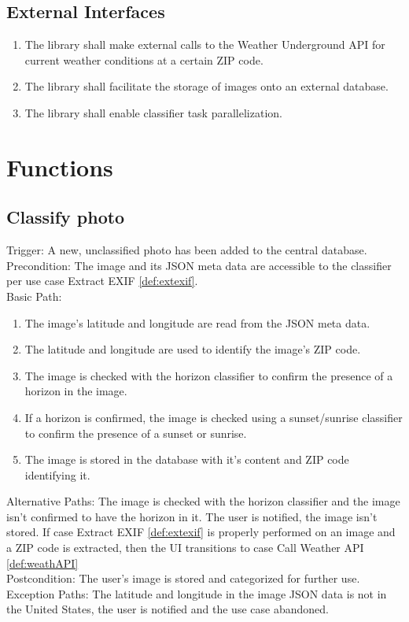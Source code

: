 \documentclass[journal,10pt,draftclsnofoot,onecolumn]{IEEEtran}
\begin{document}
\begin{singlespace}
	\subsection{External Interfaces}
		\begin{enumerate}
			\item The library shall make external calls to the Weather Underground API \cite{api_weather_underground} for current weather conditions at a certain ZIP code.
			\item The library shall facilitate the storage of images onto an external database.
			\item The library shall enable classifier task parallelization.
		\end{enumerate}

\clearpage

\section{Functions}
	\subsection{Classify photo} \label{def:classPh}
		Trigger: A new, unclassified photo has been added to the central database.\\
		Precondition: The image and its JSON meta data are accessible to the classifier per use case Extract EXIF \ref{def:extexif}.\\
		Basic Path:
		\begin{enumerate}
			\item The image's latitude and longitude are read from the JSON meta data.
			\item The latitude and longitude are used to identify the image's ZIP code.
			\item The image is checked with the horizon classifier to confirm the presence of a horizon in the image.
			\item If a horizon is confirmed, the image is checked using a sunset/sunrise classifier to confirm the presence of a sunset or sunrise.
			\item The image is stored in the database with it's content and ZIP code identifying it.
		\end{enumerate}
		Alternative Paths: The image is checked with the horizon classifier and the image isn't confirmed to have the horizon in it. The user is notified, the image isn't stored. If case Extract EXIF \ref{def:extexif} is properly performed on an image and a ZIP code is extracted, then the UI transitions to case Call Weather API \ref{def:weathAPI}\\
		Postcondition: The user's image is stored and categorized for further use.\\
		Exception Paths: The latitude and longitude in the image JSON data is not in the United States, the user is notified and the use case abandoned.
	

\end{singlespace}
\end{document}
